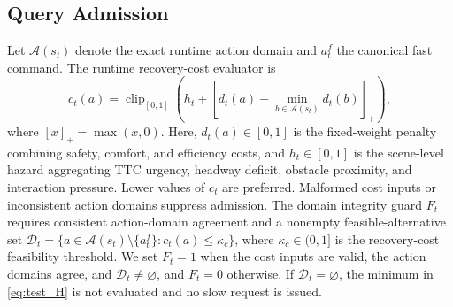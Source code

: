 \documentclass[letterpaper,journal]{IEEEtran}
\begin{document}
\subsection{Query Admission}
Let $\mathcal A(s_t)$ denote the exact runtime action domain and $a_t^f$ the
canonical fast command. The runtime recovery-cost evaluator is
\begin{equation}
c_t(a)=\operatorname{clip}_{[0,1]}\!\left(
h_t+\left[d_t(a)-\min_{b\in\mathcal A(s_t)}d_t(b)\right]_+\right),
\label{eq:recovery_cost}
\end{equation}
where $[x]_+=\max(x,0)$. Here, $d_t(a)\in[0,1]$ is the fixed-weight penalty
combining safety, comfort, and efficiency costs, and $h_t\in[0,1]$ is the
scene-level hazard aggregating TTC urgency, headway deficit, obstacle
proximity, and interaction pressure. Lower values of $c_t$ are preferred.
Malformed cost inputs or inconsistent action domains suppress admission. The
domain integrity guard $F_t$ requires consistent action-domain agreement and
a nonempty feasible-alternative set
$\mathcal D_t=\{a\in\mathcal A(s_t)\setminus\{a_t^f\}:c_t(a)\leq\kappa_c\}$,
where $\kappa_c\in(0,1]$ is the recovery-cost feasibility threshold. We set
$F_t=1$ when the cost inputs are valid, the action domains agree, and
$\mathcal D_t\ne\varnothing$, and $F_t=0$ otherwise. If
$\mathcal D_t=\varnothing$, the minimum in
\eqref{eq:test_H} is not evaluated and no slow request is issued.
\end{document}
